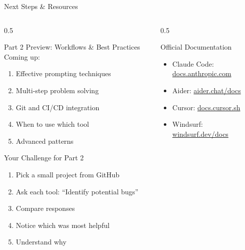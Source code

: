 \documentclass[aspectratio=169,11pt]{beamer}
\begin{document}
\begin{frame}{Next Steps \& Resources}
    \begin{columns}[T]
        \begin{column}{0.5\textwidth}
            \begin{block}{Part 2 Preview: Workflows \& Best Practices}
                Coming up:
                \begin{enumerate}
                    \item Effective prompting techniques
                    \item Multi-step problem solving
                    \item Git and CI/CD integration
                    \item When to use which tool
                    \item Advanced patterns
                \end{enumerate}
            \end{block}

            \begin{exampleblock}{Your Challenge for Part 2}
                \begin{enumerate}
                    \item Pick a small project from GitHub
                    \item Ask each tool: ``Identify potential bugs''
                    \item Compare responses
                    \item Notice which was most helpful
                    \item Understand why
                \end{enumerate}
            \end{exampleblock}
        \end{column}
        \begin{column}{0.5\textwidth}
            \begin{block}{Official Documentation}
                \small
                \begin{itemize}
                    \item Claude Code: \url{docs.anthropic.com}
                    \item Aider: \url{aider.chat/docs}
                    \item Cursor: \url{docs.cursor.sh}
                    \item Windsurf: \url{windsurf.dev/docs}
                \end{itemize}
            \end{block}


\end{column}
\end{columns}
\end{frame}
\end{document}
